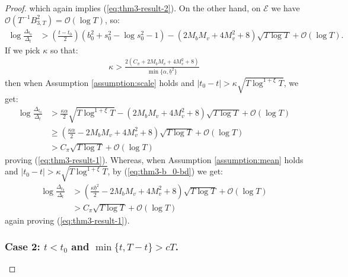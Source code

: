 \begin{proof}
which again implies (\ref{eq:thm3-result-2}). On the other hand, on $\mathcal{E}$ we have $\mathcal{O}\left(T^{-1}B^2_{3,T}\right) = \mathcal{O}\left(\log T\right)$, so:
\begin{align*}
    \log \frac{\Delta_{t_0}}{\Delta_t} &>  \left(\frac{t-t_0}{2}\right)\left(b_0^2 + s_0^2 - \log s_0^2 - 1\right)  -  \left(2M_bM_v +4M_v^2 + 8\right) \sqrt{T \log T} + \mathcal{O}(\log T).
\end{align*}
If we pick $\kappa$ so that: 
\begin{align*}
    \kappa > \frac{2(C_\pi + 2M_bM_v +4M_v^2 + 8)}{\min\{\alpha, \underline{b}^2\}}
\end{align*}
then when Assumption \ref{assumption:scale} holds and $|t_0 - t| > \kappa \sqrt{T\log^{1+\xi} T}$, we get:
\begin{align*}
    \log \frac{\Delta_{t_0}}{\Delta_t} &> \frac{\kappa \alpha}{2}\sqrt{T\log^{1+\xi} T}  -  \left(2M_bM_v +4M_v^2 + 8\right) \sqrt{T \log T} + \mathcal{O}(\log T)\\ 
    &\geq \left(\frac{\kappa \alpha}{2} - 2M_bM_v +4M_v^2 + 8\right) \sqrt{T \log T} + \mathcal{O}(\log T) \tag{$\xi \geq 0$} \\
    &> C_\pi \sqrt{T \log T} + \mathcal{O}(\log T)
\end{align*}
proving (\ref{eq:thm3-result-1}). Whereas, when Assumption \ref{assumption:mean} holds and $|t_0 - t| > \kappa \sqrt{T\log^{1+\xi} T}$, by (\ref{eq:thm3-b_0-bd}) we get:
\begin{align*}
    \log \frac{\Delta_{t_0}}{\Delta_t} &> \left(\frac{\kappa \underline{b}^2}{2} - 2M_bM_v +4M_v^2 + 8\right) \sqrt{T \log T} + \mathcal{O}(\log T) \\
    &> C_\pi \sqrt{T \log T} + \mathcal{O}(\log T)
\end{align*}
again proving (\ref{eq:thm3-result-1}). 

\subsubsection*{Case 2: $t < t_0$ and $\min\{t, T-t\} > cT$.}


\end{proof}
